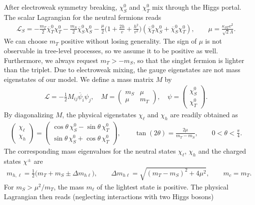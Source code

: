 \documentclass[nofootinbib,prd,aps,superscriptaddress,preprintnumbers]{revtex4}
\begin{document}
After electroweak symmetry breaking, $\chi_S^0$ and $\chi_T^0$ mix through the Higgs portal. The scalar Lagrangian for the neutral fermions reads
\begin{align}\label{eq:lag-mass}
\mathcal{L}_S =  -\frac{m_T}{2} \overline{\chi}_T^0\chi_T^0 - \frac{m_S}{2} \overline{\chi}_S^0\chi_S^0 - \frac{\mu}{2}\Big(1 + \frac{2h}{v} + \frac{h^2}{v^2}\Big)\left(\overline{\chi}_T^0\chi_S^0 + \overline{\chi}_S^0\chi_T^0\right),\qquad \mu = \frac{\kappa_{ST} v^2}{\sqrt{2}\Lambda}.
\end{align}
We can choose $m_T$ positive without losing generality. The sign of $\mu$ is not observable in tree-level processes, so we assume it to be positive as well. Furthermore, we always request $m_T > - m_S$, so that the singlet fermion is lighter than the triplet. Due to electroweak mixing, the gauge eigenstates are not mass eigenstates of our model. We define a mass matrix $M$ by
\begin{align}
\mathcal{L} = - \frac{1}{2} M_{ij} \overline{\psi}_i\psi_j,\quad
M = \begin{pmatrix}
m_S & \mu\\
\mu & m_T
\end{pmatrix},\quad \psi = \begin{pmatrix}
\chi_S^0\\
\chi_T^0
\end{pmatrix}.
\end{align}
By diagonalizing $M$, the physical eigenstates $\chi_\ell$ and $\chi_h$ are readily obtained as
\begin{align}
\begin{pmatrix}
\chi_\ell\\
\chi_h
\end{pmatrix}
= \begin{pmatrix}
 \cos\theta\,\chi_S^0 - \sin\theta\,\chi_T^0\\
 \sin\theta\,\chi_S^0 + \cos\theta\,\chi_T^0
\end{pmatrix},\qquad \tan(2\theta) = \frac{2\mu}{m_T - m_S},\qquad 0 < \theta < \frac{\pi}{4}.
\end{align}
The corresponding mass eigenvalues for the neutral states $\chi_\ell$, $\chi_h$ and the charged states $\chi^\pm$ are
\begin{align}
m_{h,\ell} = \frac{1}{2}\Big(m_T + m_S \pm \Delta m_{h\ell}\Big),\qquad \Delta m_{h\ell} = \sqrt{(m_T-m_S)^2+4\mu^2},\qquad m_c = m_T.
\end{align}
For $m_S > \mu^2/m_T$, the mass $m_\ell$ of the lightest state is positive. The physical Lagrangian then reads (neglecting interactions with two Higgs bosons)
\end{document}
